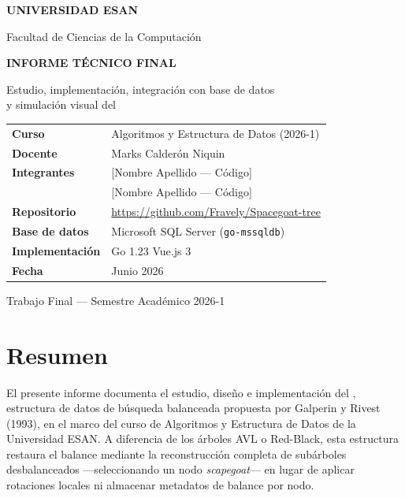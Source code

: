 \documentclass[12pt,a4paper,oneside]{report}
\begin{document}
\begin{titlepage}
  \thispagestyle{empty}
  \centering
  \vspace*{1.2cm}
  {\large\textbf{UNIVERSIDAD ESAN}\par}
  \vspace{0.3cm}
  {\normalsize Facultad de Ciencias de la Computación\par}
  \vspace{2.2cm}
  {\huge\bfseries\color{esanblue} INFORME TÉCNICO FINAL\par}
  \vspace{1.2cm}
  {\Large Estudio, implementación, integración con base de datos\\[0.35em]
  y simulación visual del \Scapegoat\par}
  \vspace{2cm}
  \begin{tabular}{@{}p{4.2cm}p{9.2cm}@{}}
    \toprule
    \textbf{Curso} & Algoritmos y Estructura de Datos (2026-1) \\
    \textbf{Docente} & Marks Calderón Niquin \\
    \textbf{Integrantes} & [Nombre Apellido --- Código] \\
    & [Nombre Apellido --- Código] \\
    \textbf{Repositorio} & \url{https://github.com/Fravely/Spacegoat-tree} \\
    \textbf{Base de datos} & Microsoft SQL Server (\texttt{go-mssqldb}) \\
    \textbf{Implementación} & Go 1.23 \textbullet{} Vue.js 3 \\
    \textbf{Fecha} & Junio 2026 \\
    \bottomrule
  \end{tabular}
  \vfill
  {\small Trabajo Final --- Semestre Académico 2026-1\par}
\end{titlepage}

\chapter*{Resumen}
{}

El presente informe documenta el estudio, diseño e implementación del \textbf{\Scapegoat}, estructura de datos de búsqueda balanceada propuesta por Galperin y Rivest (1993), en el marco del curso de Algoritmos y Estructura de Datos de la Universidad ESAN. A diferencia de los árboles AVL o Red-Black, esta estructura restaura el balance mediante la reconstrucción completa de subárboles desbalanceados ---seleccionando un nodo \textit{scapegoat}--- en lugar de aplicar rotaciones locales ni almacenar metadatos de balance por nodo.
\end{document}
